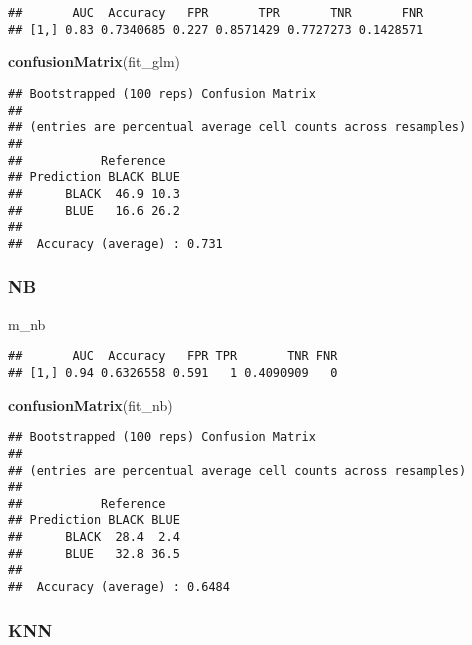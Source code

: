 \documentclass[
]{article}
\newenvironment{Shaded}{\begin{snugshade}}{\end{snugshade}}
\newcommand{\KeywordTok}[1]{\textcolor[rgb]{0.13,0.29,0.53}{\textbf{#1}}}
\newcommand{\NormalTok}[1]{#1}
\begin{document}
\begin{verbatim}
##       AUC  Accuracy   FPR       TPR       TNR       FNR
## [1,] 0.83 0.7340685 0.227 0.8571429 0.7727273 0.1428571
\end{verbatim}

\begin{Shaded}
\begin{Highlighting}[]
\KeywordTok{confusionMatrix}\NormalTok{(fit_glm)}
\end{Highlighting}
\end{Shaded}

\begin{verbatim}
## Bootstrapped (100 reps) Confusion Matrix 
## 
## (entries are percentual average cell counts across resamples)
##  
##           Reference
## Prediction BLACK BLUE
##      BLACK  46.9 10.3
##      BLUE   16.6 26.2
##                            
##  Accuracy (average) : 0.731
\end{verbatim}

\hypertarget{nb}{%
\subsubsection{NB}\label{nb}}

\begin{Shaded}
\begin{Highlighting}[]
\NormalTok{m_nb}
\end{Highlighting}
\end{Shaded}

\begin{verbatim}
##       AUC  Accuracy   FPR TPR       TNR FNR
## [1,] 0.94 0.6326558 0.591   1 0.4090909   0
\end{verbatim}

\begin{Shaded}
\begin{Highlighting}[]
\KeywordTok{confusionMatrix}\NormalTok{(fit_nb)}
\end{Highlighting}
\end{Shaded}

\begin{verbatim}
## Bootstrapped (100 reps) Confusion Matrix 
## 
## (entries are percentual average cell counts across resamples)
##  
##           Reference
## Prediction BLACK BLUE
##      BLACK  28.4  2.4
##      BLUE   32.8 36.5
##                             
##  Accuracy (average) : 0.6484
\end{verbatim}

\hypertarget{knn}{%
\subsubsection{KNN}\label{knn}}
\end{document}
